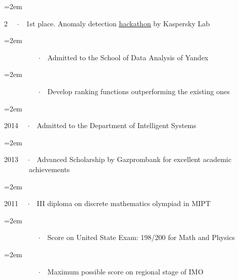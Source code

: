 \documentclass{article}
\newcommand{\Description}[1]{\hangindent=2em\hangafter=0\noindent\raggedright\footnotesize{#1}\par\normalsize\vspace{1em}} %
\begin{document}
\begin{cv}{}
\Description{2  \ \ $\cdotp$\ \ 1st place. Anomaly detection \href{https://mipt.ru/news/studenty_mfti_stali_pobeditelyami_khakatona_ot_laboratorii_kasperskogo}{\color{black}\underline{hackathon}} by Kaspersky Lab
}

\vspace{-0.5em} %


\Description{~~~~~~~ \ \ $\cdotp$\ \ Admitted to the School of Data Analysis of Yandex}



\vspace{-0.5em} %

\Description{~~~~~~~ \ \ $\cdotp$\ \ Develop ranking functions outperforming the existing ones}

\vspace{-0.5em} %

\Description{2014 \ \ $\cdotp$\ \ Admitted to the Department of Intelligent Systems}

\vspace{-0.5em} %


\Description{2013 \ \ $\cdotp$\ \ Advanced Scholarship by Gazprombank for excellent academic \newline ~~~~~~~achievements}

\vspace{-0.5em} %




\Description{2011 \ \ $\cdotp$\ \ III diploma on discrete mathematics olympiad in MIPT}

\vspace{-0.5em} %

\Description{~~~~~~~ \ \ $\cdotp$\ \ Score on United State Exam: 198/200 for Math and Physics}



\vspace{-0.5em} %

\Description{~~~~~~~ \ \ $\cdotp$\ \ Maximum possible score on regional stage of IMO}
\vspace{-0.5em} %



\end{cv}
\end{document}
